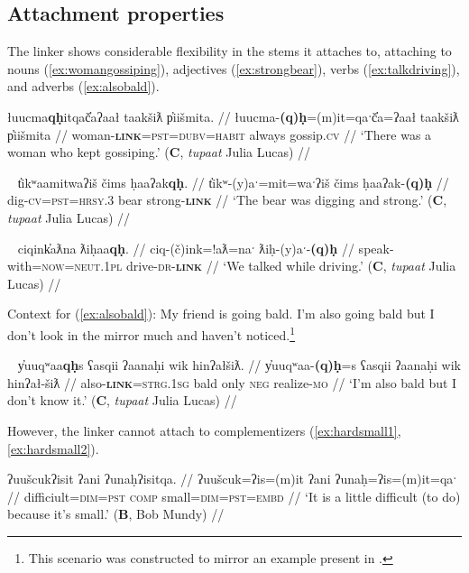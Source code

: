 \subsection{Attachment properties} \label{ch:link:attach}

The linker shows considerable flexibility in the stems it attaches to, attaching to nouns (\ref{ex:womangossiping}), adjectives (\ref{ex:strongbear}), verbs (\ref{ex:talkdriving}), and adverbs (\ref{ex:alsobald}).

\ex \label{ex:womangossiping}
\begingl
\glpreamble łuucma\textbf{qḥ}itqač̓aʔaał taakšiƛ p̓iišmita. //
\gla łuucma-\textbf{(q)ḥ}=(m)it=qaˑč̓a=ʔaał taakšiƛ p̓iišmita //
\glb woman-\textbf{\textsc{link}}=\textsc{pst}=\textsc{dubv}=\textsc{habit} always gossip.\textsc{cv} //
\glft `There was a woman who kept gossiping.' (\textbf{C}, \textit{tupaat} Julia Lucas) //
\endgl
\xe

\ex~ \label{ex:strongbear}
\begingl
\glpreamble t̓ikʷaamitwaʔiš čims ḥaaʔak\textbf{qḥ}. //
\gla t̓ikʷ-(y)aˑ=mit=waˑʔiš čims ḥaaʔak-\textbf{(q)ḥ} //
\glb dig-\textsc{cv}=\textsc{pst}=\textsc{hrsy.3} bear strong-\textbf{\textsc{link}} //
\glft `The bear was digging and strong.' (\textbf{C}, \textit{tupaat} Julia Lucas) //
\endgl
\xe

\ex~ \label{ex:talkdriving}
\begingl
\glpreamble ciqink̓aƛna ƛiḥaa\textbf{qḥ}. //
\gla ciq-(č)ink=!aƛ=naˑ ƛiḥ-(y)aˑ-\textbf{(q)ḥ} //
\glb speak-with=\textsc{now}=\textsc{neut.1pl} drive-\textsc{dr}-\textbf{\textsc{link}} //
\glft `We talked while driving.' (\textbf{C}, \textit{tupaat} Julia Lucas) //
\endgl
\xe

\noindent Context for (\ref{ex:alsobald}): My friend is going bald. I'm also going bald but I don't look in the mirror much and haven't noticed.\footnote{This scenario was constructed to mirror an example present in \citet{sapir1939}.}


\ex~ \label{ex:alsobald}
\begingl
\glpreamble y̓uuqʷaa\textbf{qḥ}s ʕasqii ʔaanaḥi wik hinʔałšiƛ. //
\gla y̓uuqʷaa-\textbf{(q)ḥ}=s ʕasqii ʔaanaḥi wik hinʔał-šiƛ //
\glb also-\textbf{\textsc{link}}=\textsc{strg.1sg} bald only \textsc{neg} realize-\textsc{mo} //
\glft `I'm also bald but I don't know it.' (\textbf{C}, \textit{tupaat} Julia Lucas) //
\endgl
\xe

However, the linker cannot attach to complementizers (\ref{ex:hardsmall1}, \ref{ex:hardsmall2}).

\ex \label{ex:hardsmall1}
\begingl
\glpreamble ʔuušcukʔisit ʔani ʔunaḥʔisitqa. //
\gla ʔuušcuk=ʔis=(m)it ʔani ʔunaḥ=ʔis=(m)it=qaˑ //
\glb difficiult=\textsc{dim}=\textsc{pst} \textsc{comp} small=\textsc{dim}=\textsc{pst}=\textsc{embd} //
\glft `It is a little difficult (to do) because it's small.' (\textbf{B}, Bob Mundy) //
\endgl
\xe

